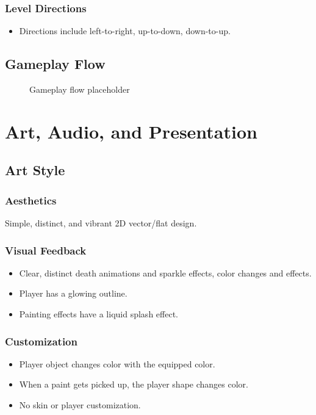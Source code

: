 \documentclass[11pt,a4paper]{report}
\begin{document}
\subsection{Level Directions}
\begin{itemize}
  \item Directions include left-to-right, up-to-down, down-to-up.
\end{itemize}

\section{Gameplay Flow}
\begin{figure}[ht]
  \centering
  \caption{Gameplay flow placeholder}
\end{figure}

\chapter{Art, Audio, and Presentation}
\section{Art Style}
\subsection{Aesthetics}
Simple, distinct, and vibrant 2D vector/flat design.

\subsection{Visual Feedback}
\begin{itemize}
  \item Clear, distinct death animations and sparkle effects, color changes and effects.
  \item Player has a glowing outline.
  \item Painting effects have a liquid splash effect.
\end{itemize}

\subsection{Customization}
\begin{itemize}
  \item Player object changes color with the equipped color.
  \item When a paint gets picked up, the player shape changes color.
  \item No skin or player customization.
\end{itemize}
\end{document}
